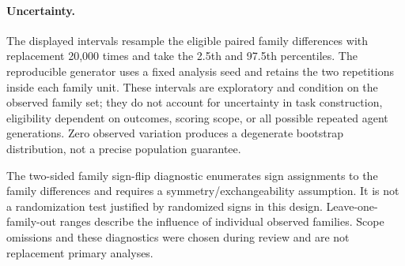 \paragraph{Uncertainty.}
The displayed intervals resample the eligible paired family differences with replacement 20,000 times and take the 2.5th and 97.5th percentiles. The reproducible generator uses a fixed analysis seed and retains the two repetitions inside each family unit. These intervals are exploratory and condition on the observed family set; they do not account for uncertainty in task construction, eligibility dependent on outcomes, scoring scope, or all possible repeated agent generations. Zero observed variation produces a degenerate bootstrap distribution, not a precise population guarantee.

The two-sided family sign-flip diagnostic enumerates sign assignments to the family differences and requires a symmetry/exchangeability assumption. It is not a randomization test justified by randomized signs in this design. Leave-one-family-out ranges describe the influence of individual observed families. Scope omissions and these diagnostics were chosen during review and are not replacement primary analyses.

\begin{table}[p]
\centering\small
\caption{All corrected complete-family contrasts, in percentage points. Positive $\Delta U$ means more functional completions that fail the focal witness. $n$ is the number of eligible families. C$-$N is primary; I$-$N and B$-$C diagnose context delivery and the boundary reminder. Intervals are exploratory 95\% paired family bootstrap intervals.}
\label{tab:contrasts-full}
\end{table}

\begin{table}[p]
\centering\small
\caption{Exact eligible family sets for the primary and secondary contrasts. Repetitions are averaged within these families.}
\end{table}
\begin{table}[p]
\centering\small
\caption{Uniform family-omission sensitivity analyses for $\Delta U$, in percentage points. The same family omission applies across configurations.}
\end{table}
\begin{table}[p]
\centering\small
\caption{Leave-one-family-out ranges and exact sign-flip diagnostics for corrected $\Delta U$. These are exploratory diagnostics with the assumptions described in the text.}
\end{table}
\begin{table}[p]
\centering\small
\caption{Exploratory C$-$I contrasts with the same complete-family rule and bootstrap procedure. Byte-matched memory envelopes do not ensure equal tokens or semantic content.}
\end{table}

